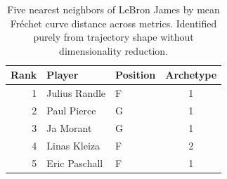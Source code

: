 \begin{table}[htbp]
  \centering\small
  \begin{tabular}{rllc}
    \toprule
    Rank & Player & Position & Archetype \\
    \midrule
    1 & Julius Randle & F & 1 \\
    2 & Paul Pierce & G & 1 \\
    3 & Ja Morant & G & 1 \\
    4 & Linas Kleiza & F & 2 \\
    5 & Eric Paschall & F & 1 \\
    \bottomrule
  \end{tabular}
  \caption{Five nearest neighbors of LeBron James by mean Fr\'{e}chet curve distance across metrics. Identified purely from trajectory shape without dimensionality reduction.}
  \label{tab:LeBron_James_frechet_curve_neighbors}
\end{table}

